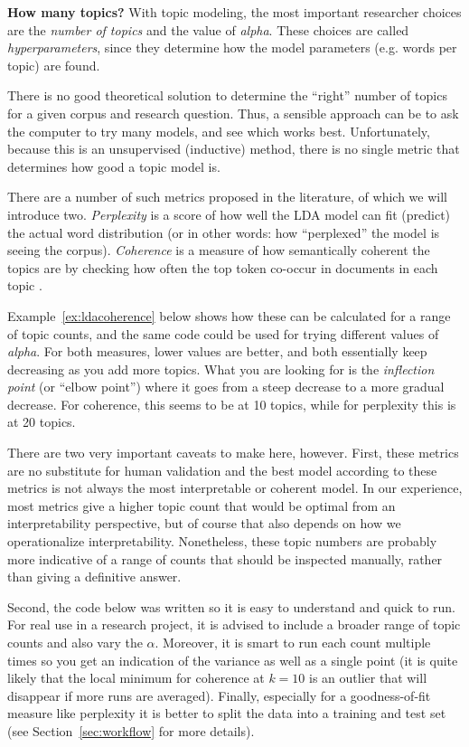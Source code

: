 \begin{feature}
  \textbf{How many topics?}
  With topic modeling, the most important researcher choices are the \emph{number of topics} and the value of \emph{alpha}.
  These choices are called \emph{hyperparameters}, since they determine how the model parameters (e.g. words per topic) are found.

  There is no good theoretical solution to determine the ``right'' number of topics for a given corpus and research question.
  Thus, a sensible approach can be to ask the computer to try many models, and see which works best.
  Unfortunately, because this is an unsupervised (inductive) method,
  there is no single metric that determines how good a topic model is.

  There are a number of such metrics proposed in the literature, of which we will introduce two.
  \emph{Perplexity}  is a score of how well the LDA model can fit (predict) the actual word distribution
  (or in other words: how ``perplexed'' the model is seeing the corpus).
  \emph{Coherence} is a measure of how semantically coherent the topics are by checking how often the top token co-occur in documents in each topic \citep{mimno11}.

  Example~\ref{ex:ldacoherence} below shows how these can be calculated for a range of topic counts, and the same code could be used for trying different values of \emph{alpha}.
  For both measures, lower values are better, and both essentially keep decreasing as you add more topics.
  What you are looking for is the \emph{inflection point} (or ``elbow point'') where it goes from a steep decrease to a more gradual decrease.
  For coherence, this seems to be at 10 topics, while for perplexity this is at 20 topics.

  There are two very important caveats to make here, however.
  First, these metrics are no substitute for human validation and the best model according to these metrics is not always the most interpretable or coherent model.
  In our experience, most metrics give a higher topic count that would be optimal from an interpretability perspective, but of course that also depends on how we operationalize interpretability.
  Nonetheless, these topic numbers are probably more indicative of a range of counts that should be inspected manually, rather than giving a definitive answer.

  Second, the code below was written so it is easy to understand and quick to run.
  For real use in a research project, it is advised to include a broader range of topic counts and also vary the $\alpha$.
  Moreover, it is smart to run each count multiple times so you get an indication of the variance as well as a single point
  (it is quite likely that the local minimum for coherence at $k=10$ is an outlier that will disappear if more runs are averaged).
  Finally, especially for a goodness-of-fit measure like perplexity it is better to split the data into a training and test set
  (see Section~\ref{sec:workflow} for more details).

\end{feature}

